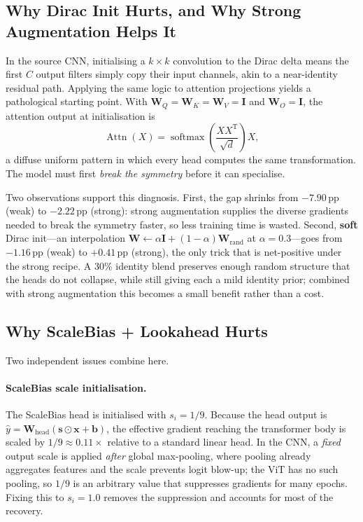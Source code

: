 \documentclass[10pt,twocolumn]{article}
\newcommand{\pp}{\,pp}   %
\begin{document}
\subsection{Why Dirac Init Hurts, and Why Strong Augmentation Helps It}\label{sec:dirac-analysis}
In the source CNN, initialising a $k\times k$ convolution to the Dirac delta means the first $C$ output filters simply copy their input channels, akin to a near-identity residual path.
Applying the same logic to attention projections yields a pathological starting point.
With $\mathbf{W}_Q = \mathbf{W}_K = \mathbf{W}_V = \mathbf{I}$ and $\mathbf{W}_O = \mathbf{I}$, the attention output at initialisation is
\begin{equation}
    \operatorname{Attn} \!\left( X \right) =
    \operatorname{softmax} \!\left( \frac{ X X^\mathrm{T} }{ \sqrt{d} } \right) X,
\end{equation}
a diffuse uniform pattern in which every head computes the same transformation.
The model must first \emph{break the symmetry} before it can specialise.

Two observations support this diagnosis.
First, the gap shrinks from $-7.90$\pp{} (weak) to $-2.22$\pp{} (strong): strong augmentation supplies the diverse gradients needed to break the symmetry faster, so less training time is wasted.
Second, \textbf{soft} Dirac init---an interpolation $\mathbf{W} \leftarrow \alpha\mathbf{I} + (1-\alpha)\mathbf{W}_\text{rand}$ at $\alpha{=}0.3$---goes from $-1.16$\pp{} (weak) to $+0.41$\pp{} (strong), the only trick that is net-positive under the strong recipe.
A 30\% identity blend preserves enough random structure that the heads do not collapse, while still giving each a mild identity prior; combined with strong augmentation this becomes a small benefit rather than a cost.

\subsection{Why ScaleBias + Lookahead Hurts}\label{sec:sbl-analysis}
Two independent issues combine here.

\paragraph{ScaleBias scale initialisation.}
The ScaleBias head is initialised with $s_i = 1/9$.
Because the head output is $\hat{y} = \mathbf{W}_\text{head}(\mathbf{s} \odot \mathbf{x} + \mathbf{b})$, the effective gradient reaching the transformer body is scaled by $1/9 \approx 0.11\times$ relative to a standard linear head.
In the CNN, a \emph{fixed} output scale is applied \emph{after} global max-pooling, where pooling already aggregates features and the scale prevents logit blow-up; the ViT has no such pooling, so $1/9$ is an arbitrary value that suppresses gradients for many epochs.
Fixing this to $s_i = 1.0$ removes the suppression and accounts for most of the recovery.
\end{document}
